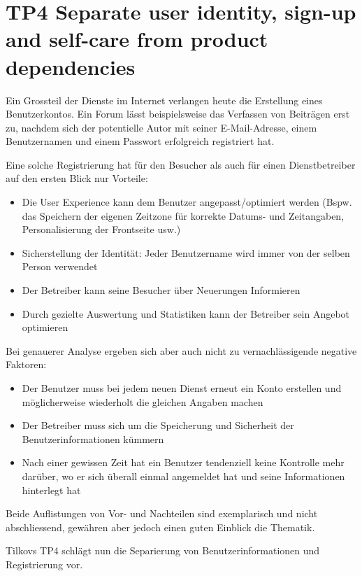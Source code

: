 \section{TP4 Separate user identity, sign-up and self-care from product dependencies}
\label{sec:principle-tp4-seperate-user-identity}

Ein Grossteil der Dienste im Internet verlangen heute die Erstellung eines Benutzerkontos. Ein Forum lässt beispielsweise das Verfassen von Beiträgen erst zu, nachdem sich der potentielle Autor mit seiner E-Mail-Adresse, einem Benutzernamen und einem Passwort erfolgreich registriert hat.

Eine solche Registrierung hat für den Besucher als auch für einen Dienstbetreiber auf den ersten Blick nur Vorteile:

\begin{itemize}
	\item Die User Experience kann dem Benutzer angepasst/optimiert werden (Bspw. das Speichern der eigenen Zeitzone für korrekte Datums- und Zeitangaben, Personalisierung der Frontseite usw.)
	\item Sicherstellung der Identität: Jeder Benutzername wird immer von der selben Person verwendet
	\item Der Betreiber kann seine Besucher über Neuerungen Informieren
	\item Durch gezielte Auswertung und Statistiken kann der Betreiber sein Angebot optimieren
\end{itemize}

Bei genauerer Analyse ergeben sich aber auch nicht zu vernachlässigende negative Faktoren:

\begin{itemize}
	\item Der Benutzer muss bei jedem neuen Dienst erneut ein Konto erstellen und möglicherweise wiederholt die gleichen Angaben machen
	\item Der Betreiber muss sich um die Speicherung und Sicherheit der Benutzerinformationen kümmern
	\item Nach einer gewissen Zeit hat ein Benutzer tendenziell keine Kontrolle mehr darüber, wo er sich überall einmal angemeldet hat und seine Informationen hinterlegt hat
\end{itemize}

Beide Auflistungen von Vor- und Nachteilen sind exemplarisch und nicht abschliessend, gewähren aber jedoch einen guten Einblick die Thematik.

Tilkovs TP4 schlägt nun die Separierung von Benutzerinformationen und Registrierung vor.

